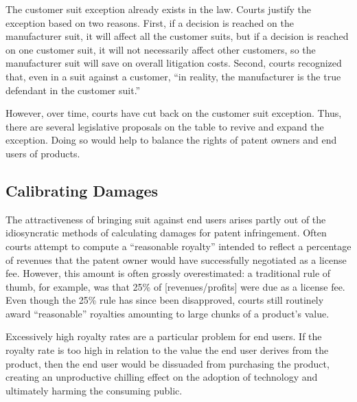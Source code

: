 \documentclass[11pt,twocolumn,titlepage]{article}
\begin{document}
The customer suit exception already exists in the law. Courts justify the
exception based on two reasons. First, if a decision is reached on the
manufacturer suit, it will affect all the customer suits, but if a decision is
reached on one customer suit, it will not necessarily affect other customers, so
the manufacturer suit will save on overall litigation costs. Second, courts recognized that, even in a suit against a
customer, ``in reality, the manufacturer is the true defendant in the
customer suit.''

However, over time, courts have cut back on the customer suit
exception. Thus, there are several legislative
proposals on the table to revive and expand the exception.
Doing so would help to balance the rights of patent owners and end users of
products.

\iffalse
\subsection{Calibrating Damages}
\SectionNote
{}

The attractiveness of bringing suit against end users
arises partly out of the idiosyncratic methods of calculating damages for
patent infringement. Often courts attempt to compute a ``reasonable royalty''
intended to reflect a percentage of revenues that the patent owner would have
successfully negotiated as a license fee. However, this amount is often grossly
overestimated: a traditional rule of thumb, for example, was that 25\% of
[revenues/profits] were due as a license fee. Even though the 25\% rule has
since been disapproved, courts still routinely award ``reasonable'' royalties
amounting to large chunks of a product's value.

Excessively high royalty rates are a particular problem for end users. If the
royalty rate is too high in relation to the value the end user derives from the
product, then the end user would be dissuaded from purchasing the product,
creating an unproductive chilling effect on the adoption of technology and
ultimately harming the consuming public.
\end{document}
